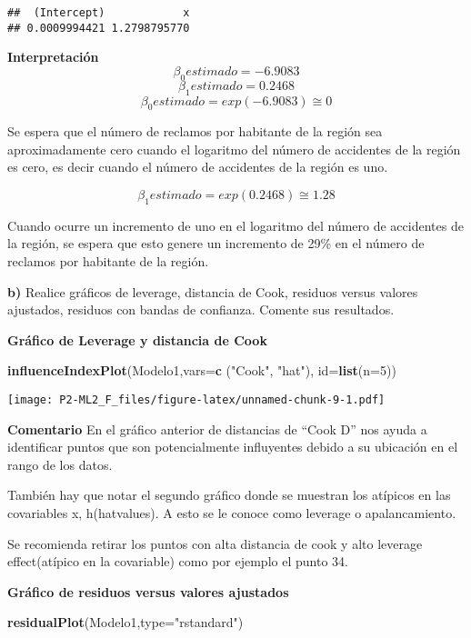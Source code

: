 \documentclass[]{article}
\newenvironment{Shaded}{\begin{snugshade}}{\end{snugshade}}
\newcommand{\DataTypeTok}[1]{\textcolor[rgb]{0.13,0.29,0.53}{#1}}
\newcommand{\DecValTok}[1]{\textcolor[rgb]{0.00,0.00,0.81}{#1}}
\newcommand{\KeywordTok}[1]{\textcolor[rgb]{0.13,0.29,0.53}{\textbf{#1}}}
\newcommand{\NormalTok}[1]{#1}
\newcommand{\StringTok}[1]{\textcolor[rgb]{0.31,0.60,0.02}{#1}}
\begin{document}
\begin{verbatim}
##  (Intercept)            x 
## 0.0009994421 1.2798795770
\end{verbatim}

\textbf{Interpretación} \[\beta_0  estimado = -6.9083\]
\[\beta_1  estimado = 0.2468\]
\[\beta_0  estimado = exp(-6.9083)  \cong 0\]

Se espera que el número de reclamos por habitante de la región sea
aproximadamente cero cuando el logaritmo del número de accidentes de la
región es cero, es decir cuando el número de accidentes de la región es
uno.

\[\beta_1  estimado = exp(0.2468) \cong 1.28\]

Cuando ocurre un incremento de uno en el logaritmo del número de
accidentes de la región, se espera que esto genere un incremento de 29\%
en el número de reclamos por habitante de la región.

\textbf{b)} Realice gráficos de leverage, distancia de Cook, residuos
versus valores ajustados, residuos con bandas de confianza. Comente sus
resultados.

\textbf{Gráfico de Leverage y distancia de Cook}

\begin{Shaded}
\begin{Highlighting}[]
\KeywordTok{influenceIndexPlot}\NormalTok{(Modelo1,}\DataTypeTok{vars=}\KeywordTok{c}\NormalTok{ (}\StringTok{"Cook"}\NormalTok{, }\StringTok{"hat"}\NormalTok{), }\DataTypeTok{id=}\KeywordTok{list}\NormalTok{(}\DataTypeTok{n=}\DecValTok{5}\NormalTok{))}
\end{Highlighting}
\end{Shaded}

\texttt{[image: P2-ML2\_F\_files/figure-latex/unnamed-chunk-9-1.pdf]}

\textbf{Comentario} En el gráfico anterior de distancias de ``Cook D''
nos ayuda a identificar puntos que son potencialmente influyentes debido
a su ubicación en el rango de los datos.

También hay que notar el segundo gráfico donde se muestran los atípicos
en las covariables x, h(hatvalues). A esto se le conoce como leverage o
apalancamiento.

Se recomienda retirar los puntos con alta distancia de cook y alto
leverage effect(atípico en la covariable) como por ejemplo el punto 34.

\textbf{Gráfico de residuos versus valores ajustados}

\begin{Shaded}
\begin{Highlighting}[]
\KeywordTok{residualPlot}\NormalTok{(Modelo1,}\DataTypeTok{type=}\StringTok{"rstandard"}\NormalTok{)}
\end{Highlighting}
\end{Shaded}
\end{document}

